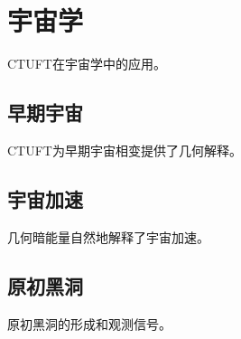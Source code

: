 \section{宇宙学}
\label{sec:cosmology}

CTUFT在宇宙学中的应用。

\subsection{早期宇宙}

CTUFT为早期宇宙相变提供了几何解释。

\subsection{宇宙加速}

几何暗能量自然地解释了宇宙加速。

\subsection{原初黑洞}

原初黑洞的形成和观测信号。

